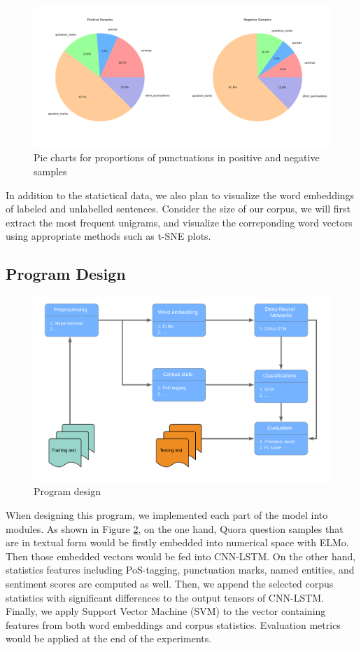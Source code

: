 \documentclass[12pt]{diazessay} %
\begin{document}
\begin{figure}[ht] 
	\includegraphics[width=\textwidth, center]{graphs/puncpiecharts.png}
	\caption{Pie charts for proportions of punctuations in positive and negative samples}
	\medskip
	\small
	\label{figure:puncpie}
\end{figure}

In addition to the statictical data, we also plan to visualize the word embeddings of labeled and unlabelled sentences. Consider the size of our corpus, we will first extract the most frequent unigrams, and visualize the correponding word vectors using appropriate methods such as t-SNE plots. 


\subsection{Program Design}
\begin{figure}[ht]
	\includegraphics[width=0.6\textheight, center]{graphs/program_desi_flow.png}
	\caption{Program design}
	\label{figure:program_design}
\end{figure}
When designing this program, we implemented each part of the model into modules. As shown in Figure \ref{figure:program_design}, on the one hand, Quora question samples that are in textual form would be firstly embedded into numerical space with ELMo. Then those embedded vectors would be fed into CNN-LSTM. On the other hand, statistics features including PoS-tagging, punctuation marks, named entities, and sentiment scores are computed as well. Then, we append the selected corpus statistics with significant differences to the output tensors of CNN-LSTM. Finally, we apply Support Vector Machine (SVM) to the vector containing features from both word embeddings and corpus statistics. Evaluation metrics would be applied at the end of the experiments.
\end{document}
